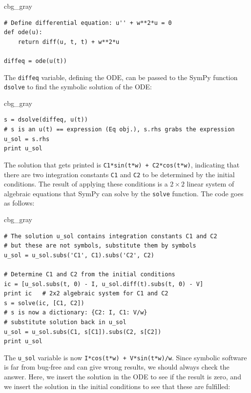 \documentclass[graybox,envcountchap,sectrefs,final]{svmonodo}
\newenvironment{_cod_tight}[1]{
   \def\FrameCommand{\colorbox{#1}}
   \FrameRule0.6pt\MakeFramed {\FrameRestore}\vskip3mm}
   {\vskip0mm\endMakeFramed}
\newenvironment{cod}[1]{
\bgroup\rmfamily
\fboxsep=0mm\relax
\begin{_cod_tight}{#1}
\list{}{\parsep=-2mm\parskip=0mm\topsep=0pt\leftmargin=2mm
\rightmargin=2\leftmargin\leftmargin=4pt\relax}
\item\relax}
{\endlist\end{_cod_tight}\egroup}
\begin{document}
\begin{cod}{cbg_gray}\begin{Verbatim}[numbers=none,fontsize=\fontsize{9pt}{9pt},baselinestretch=0.95,xleftmargin=2mm]
# Define differential equation: u'' + w**2*u = 0
def ode(u):
    return diff(u, t, t) + w**2*u

diffeq = ode(u(t))
\end{Verbatim}
\end{cod}
\noindent
The \texttt{diffeq} variable, defining the ODE, can be passed to the SymPy
function \texttt{dsolve} to find the symbolic solution of the ODE:

\begin{cod}{cbg_gray}\begin{Verbatim}[numbers=none,fontsize=\fontsize{9pt}{9pt},baselinestretch=0.95,xleftmargin=2mm]
s = dsolve(diffeq, u(t))
# s is an u(t) == expression (Eq obj.), s.rhs grabs the expression
u_sol = s.rhs
print u_sol
\end{Verbatim}
\end{cod}
\noindent
The solution that gets printed is \texttt{C1*sin(t*w) + C2*cos(t*w)}, indicating
that there are two integration constants \texttt{C1} and \texttt{C2} to be determined
by the initial conditions. The result of applying these conditions is
a $2\times 2$ linear system of algebraic equations that SymPy can solve
by the \texttt{solve} function. The code goes as follows:

\begin{cod}{cbg_gray}\begin{Verbatim}[numbers=none,fontsize=\fontsize{9pt}{9pt},baselinestretch=0.95,xleftmargin=2mm]
# The solution u_sol contains integration constants C1 and C2
# but these are not symbols, substitute them by symbols
u_sol = u_sol.subs('C1', C1).subs('C2', C2)

# Determine C1 and C2 from the initial conditions
ic = [u_sol.subs(t, 0) - I, u_sol.diff(t).subs(t, 0) - V]
print ic   # 2x2 algebraic system for C1 and C2
s = solve(ic, [C1, C2])
# s is now a dictionary: {C2: I, C1: V/w}
# substitute solution back in u_sol
u_sol = u_sol.subs(C1, s[C1]).subs(C2, s[C2])
print u_sol
\end{Verbatim}
\end{cod}
\noindent
The \Verb!u_sol! variable is now \texttt{I*cos(t*w) + V*sin(t*w)/w}.
Since symbolic software is far from bug-free and can give wrong results,
we should always check the answer. Here, we insert the solution in the ODE
to see if the result is zero, and we insert the solution in the initial
conditions to see that these are fulfilled:
\end{document}
